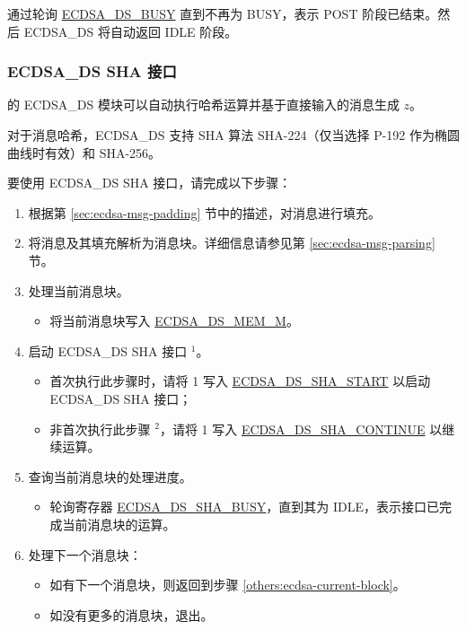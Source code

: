 \documentclass[main\_\_CN.tex]{subfiles}
\begin{document}
通过轮询 \hyperref[fielddesc:ECDSADSBUSY]{ECDSA\_DS\_BUSY} 直到不再为 BUSY，表示 POST 阶段已结束。然后 ECDSA\_DS 将自动返回 IDLE 阶段。

\subsubsection{ECDSA\_DS SHA 接口}
\label{sec:ecdsa-sha-interface}

\chipseries{} 的 ECDSA\_DS 模块可以自动执行哈希运算并基于直接输入的消息生成 $z$。

对于消息哈希，ECDSA\_DS 支持 SHA 算法 SHA-224（仅当选择 P-192 作为椭圆曲线时有效）和 SHA-256。

要使用 ECDSA\_DS SHA 接口，请完成以下步骤：

\begin{enumerate}
	\item 根据第 \ref{sec:ecdsa-msg-padding} 节中的描述，对消息进行填充。
	\item 将消息及其填充解析为消息块。详细信息请参见第 \ref{sec:ecdsa-msg-parsing} 节。
	\item \label{others:ecdsa-current-block} 处理当前消息块。
	      \begin{itemize}
		      \item 将当前消息块写入 \hyperref[tab:ecdsa-memory]{ECDSA\_DS\_MEM\_M}。
	      \end{itemize}
	\item 启动 ECDSA\_DS SHA 接口 \hyperref[others:ecdsa-note-sha]{$^1$}。
	      \begin{itemize}
		      \item 首次执行此步骤时，请将 1 写入 \hyperref[fielddesc:ECDSADSSHASTART]{ECDSA\_DS\_SHA\_START} 以启动 ECDSA\_DS SHA 接口；
		      \item 非首次执行此步骤 \hyperref[others:ecdsa-note-sha]{$^2$}，请将 1 写入 \hyperref[fielddesc:ECDSADSSHACONTINUE]{ECDSA\_DS\_SHA\_CONTINUE} 以继续运算。
	      \end{itemize}
	\item 查询当前消息块的处理进度。
	      \begin{itemize}
		      \item 轮询寄存器 \hyperref[fielddesc:ECDSADSSHABUSY]{ECDSA\_DS\_SHA\_BUSY}，直到其为 IDLE，表示接口已完成当前消息块的运算。
	      \end{itemize}

	\item 处理下一个消息块：
	      \begin{itemize}
		      \item 如有下一个消息块，则返回到步骤 \ref{others:ecdsa-current-block}。
		      \item 如没有更多的消息块，退出。
	      \end{itemize}

\end{enumerate}
\end{document}

